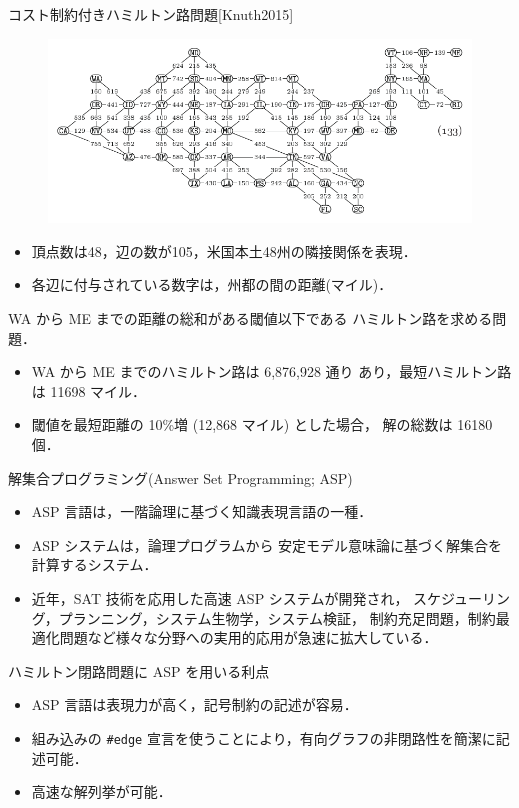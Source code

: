 \documentclass[dvipdfmx,10pt]{beamer}
\begin{document}
\begin{frame}{コスト制約付きハミルトン路問題[Knuth2015]}
  \begin{figure}[tb]
  \centering
  \includegraphics[width=0.8\linewidth]{fig/taocp_vol4fasc1b_p52_eq133.pdf}
  \end{figure}
  \begin{itemize}  
  \item 頂点数は48，辺の数が105，米国本土48州の隣接関係を表現．
  \item 各辺に付与されている数字は，州都の間の距離(マイル)．
  \end{itemize}
  \begin{block}{}
    WA から ME までの距離の総和がある閾値以下である
    ハミルトン路を求める問題．
  \end{block}
  \begin{itemize}
  \item WA から ME までのハミルトン路は 6,876,928 通り
    あり，最短ハミルトン路は 11698 マイル．
  \item 閾値を最短距離の 10\%増 (12,868 マイル) とした場合，
    解の総数は 16180 個．
  \end{itemize}
\end{frame}
\begin{frame}{解集合プログラミング(Answer Set Programming; ASP)}
  \begin{itemize}
  \item \alert{ASP 言語}は，一階論理に基づく知識表現言語の一種．
  \item \alert{ASP システム}は，論理プログラムから
    安定モデル意味論に基づく解集合を計算するシステム．
  \item 近年，SAT 技術を応用した高速 ASP システムが開発され，
    スケジューリング，プランニング，システム生物学，システム検証，
    制約充足問題，制約最適化問題など様々な分野への実用的応用が急速に拡大している．
  \end{itemize}

  \begin{alertblock}{ハミルトン閉路問題に ASP を用いる利点}
    \begin{itemize}
    \item ASP 言語は表現力が高く，記号制約の記述が容易．
    \item 組み込みの \texttt{\#edge} 宣言を使うことにより，有向グラフの非閉路性を簡潔に記述可能．
    \item 高速な解列挙が可能．
    \end{itemize}
  \end{alertblock}
\end{frame}
\end{document}
